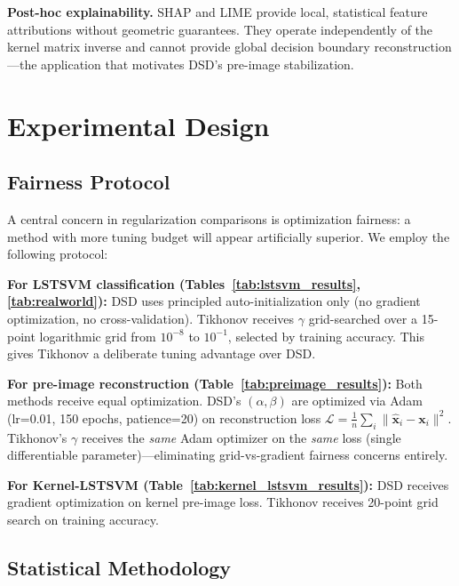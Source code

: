 \documentclass[journal]{IEEEtran}
\begin{document}
\textbf{Post-hoc explainability.} SHAP \cite{lundberg2017unified} and LIME \cite{ribeiro2016why} provide local, statistical feature attributions without geometric guarantees. They operate independently of the kernel matrix inverse and cannot provide global decision boundary reconstruction---the application that motivates DSD's pre-image stabilization.


\section{Experimental Design}
\label{sec:experiments}

\subsection{Fairness Protocol}

A central concern in regularization comparisons is optimization fairness: a method with more tuning budget will appear artificially superior. We employ the following protocol:

\textbf{For LSTSVM classification (Tables~\ref{tab:lstsvm_results}, \ref{tab:realworld}):} DSD uses principled auto-initialization only (no gradient optimization, no cross-validation). Tikhonov receives $\gamma$ grid-searched over a 15-point logarithmic grid from $10^{-8}$ to $10^{-1}$, selected by training accuracy. This gives Tikhonov a deliberate tuning advantage over DSD.

\textbf{For pre-image reconstruction (Table~\ref{tab:preimage_results}):} Both methods receive equal optimization. DSD's $(\alpha, \beta)$ are optimized via Adam (lr=0.01, 150 epochs, patience=20) on reconstruction loss $\mathcal{L} = \frac{1}{n}\sum_i \|\hat{\bm{x}}_i - \bm{x}_i\|^2$. Tikhonov's $\gamma$ receives the \emph{same} Adam optimizer on the \emph{same} loss (single differentiable parameter)---eliminating grid-vs-gradient fairness concerns entirely.

\textbf{For Kernel-LSTSVM (Table~\ref{tab:kernel_lstsvm_results}):} DSD receives gradient optimization on kernel pre-image loss. Tikhonov receives 20-point grid search on training accuracy.

\subsection{Statistical Methodology}
\end{document}
